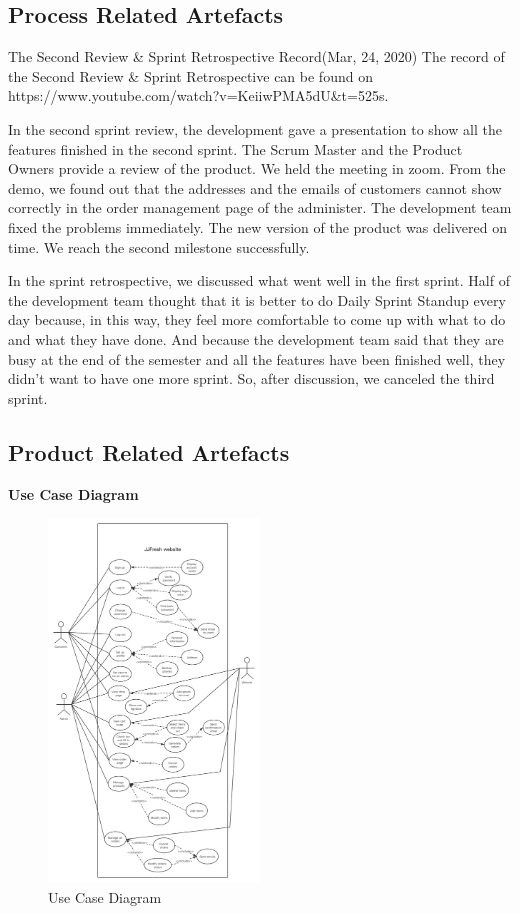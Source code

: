 
\subsection{Process Related Artefacts}
The Second Review \& Sprint Retrospective Record(Mar, 24, 2020)
The record of the Second Review \& Sprint Retrospective can be found on https://www.youtube.com/watch?v=KeiiwPMA5dU\&t=525s. 

In the second sprint review, the development gave a presentation to show all the features finished in the second sprint. The Scrum Master and the Product Owners provide a review of the product. We held the meeting in zoom. From the demo, we found out that the addresses and the emails of customers cannot show correctly in the order management page of the administer. The development team fixed the problems immediately. The new version of the product was delivered on time. We reach the second milestone successfully.

In the sprint retrospective, we discussed what went well in the first sprint. Half of the development team thought that it is better to do Daily Sprint Standup every day because, in this way, they feel more comfortable to come up with what to do and what they have done. And because the development team said that they are busy at the end of the semester and all the features have been finished well, they didn't want to have one more sprint. So, after discussion, we canceled the third sprint.

\clearpage
\subsection{Product Related Artefacts}
\textbf{Use Case Diagram}
\begin{figure}[htp]
\centering
\includegraphics[width=0.5\textwidth]{Figures/useCaseDiagram.png}
\caption{Use Case Diagram}
\label{fig:useCaseDiagram}
\end{figure}


